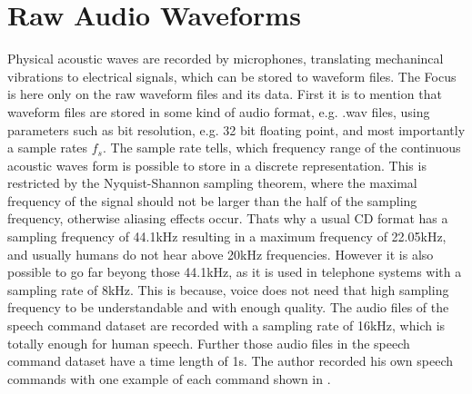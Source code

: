 
\section{Raw Audio Waveforms}\label{sec:raw_audio}\label{sec:signal_raw}
Physical acoustic waves are recorded by microphones, translating mechanincal vibrations to electrical signals, which can be stored to waveform files.
The Focus is here only on the raw waveform files and its data.
First it is to mention that waveform files are stored in some kind of audio format, e.g. .wav files, using parameters such as bit resolution, e.g. 32 bit floating point, and most importantly a sample rates $f_s$. 
The sample rate tells, which frequency range of the continuous acoustic waves form is possible to store in a discrete representation.
This is restricted by the Nyquist-Shannon sampling theorem, where the maximal frequency of the signal should not be larger than the half of the sampling frequency, otherwise aliasing effects occur. 
Thats why a usual CD format has a sampling frequency of 44.1kHz resulting in a maximum frequency of 22.05kHz, and usually humans do not hear above 20kHz frequencies.
However it is also possible to go far beyong those 44.1kHz, as it is used in telephone systems with a sampling rate of 8kHz.
This is because, voice does not need that high sampling frequency to be understandable and with enough quality.
The audio files of the speech command dataset are recorded with a sampling rate of 16kHz, which is totally enough for human speech.
Further those audio files in the speech command dataset have a time length of 1s.
The author recorded his own speech commands with one example of each command shown in .

